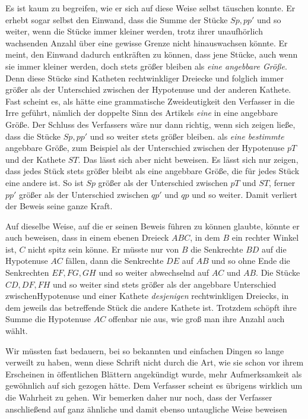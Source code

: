 %
Es ist kaum zu begreifen, wie er sich auf diese Weise selbst täuschen konnte. Er erhebt sogar selbst den Einwand, dass die Summe der Stücke \(Sp,pp'\) und so weiter, wenn die Stücke immer kleiner werden, trotz ihrer unaufhörlich wachsenden Anzahl über eine gewisse Grenze nicht hinauswachsen könnte. Er meint, den Einwand dadurch entkräften zu können, dass jene Stücke, auch wenn sie immer kleiner werden, doch stets größer bleiben als \textit{eine angebbare Größe}. Denn diese Stücke sind Katheten rechtwinkliger Dreiecke und folglich immer größer als der Unterschied zwischen der Hypotenuse und der anderen Kathete. Fast scheint es, als hätte eine grammatische Zweideutigkeit den Verfasser in die Irre geführt, nämlich der doppelte Sinn des Artikels \textit{eine} in eine angebbare Größe. Der Schluss des Verfassers wäre nur dann richtig, wenn sich zeigen ließe, dass die Stücke \(Sp,pp'\) und so weiter stets größer bleiben. als \textit{eine bestimmte} angebbare Größe, zum Beispiel als der Unterschied zwischen der Hypotenuse \(pT\) und der Kathete \(ST\). Das lässt sich aber nicht beweisen. Es lässt sich nur zeigen, dass jedes Stück stets größer bleibt als eine angebbare Größe, die für jedes Stück eine andere ist. So ist \(Sp\) größer als der Unterschied zwischen \(pT\) und \(ST\), ferner \(pp'\) größer als der Unterschied zwischen \(qp'\) und \(qp\) und so weiter. Damit verliert der Beweis seine ganze Kraft.

Auf dieselbe Weise, auf die er seinen Beweis führen zu können glaubte, könnte er auch beweisen, dass in einem ebenen Dreieck \(ABC\), in dem \(B\) ein rechter Winkel ist, \(C\) nicht spitz sein könne. Er müsste nur von \(B\) die Senkrechte \(BD\) auf die Hypotenuse \(AC\) fällen, dann die Senkrechte \(DE\) auf \(AB\) und so ohne Ende die Senkrechten \(EF,FG,GH\) und so weiter abwechselnd auf \(AC\) und \(AB\). Die Stücke \(CD,DF,FH\) und so weiter sind stets größer als der angebbare Unterschied zwischenHypotenuse und einer Kathete \textit{desjenigen} rechtwinkligen Dreiecks, in dem jeweils das betreffende Stück die andere Kathete ist. Trotzdem schöpft ihre Summe die Hypotenuse \(AC\) offenbar nie aus, wie groß man ihre Anzahl auch wählt.

Wir müssten fast bedauern, bei so bekannten und einfachen Dingen so lange verweilt zu haben, wenn diese Schrift nicht durch die Art, wie sie schon vor ihrem Erscheinen in öffentlichen Blättern angekündigt wurde, mehr Aufmerksamkeit als gewöhnlich auf sich gezogen hätte. Dem Verfasser scheint es übrigens wirklich um die Wahrheit zu gehen. Wir bemerken daher nur noch, dass der Verfasser anschließend auf ganz ähnliche und damit ebenso untaugliche Weise beweisen %
